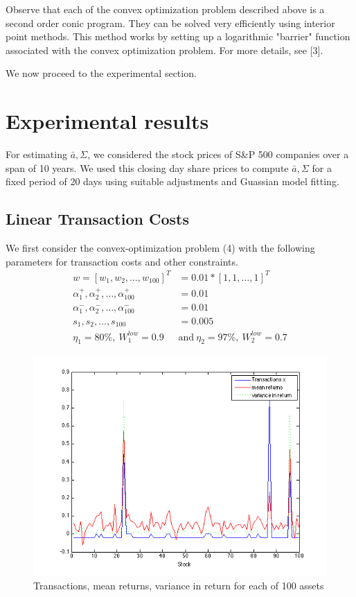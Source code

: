 \documentclass[a4paper]{article}
\begin{document}
Observe that each of the convex optimization problem described above is a second order conic program. They can be solved very efficiently using interior point methods. 
This method works by setting up a logarithmic "barrier" function associated with the convex optimization problem. For more details, see [3]. 


We now proceed to the experimental section.

\section{Experimental results}

For estimating $\bar{a},\Sigma$, we considered the stock prices of S\&P 500 companies over a span of 10 years. We used this closing day share prices to compute $\bar{a},\Sigma$ for a fixed period of 20 days using suitable adjustments and Guassian model fitting. 

\subsection{Linear Transaction Costs}
We first consider the convex-optimization problem (4) with the following parameters for transaction costs and other constraints.
\begin{align*}
w=[w_1,w_2,\ldots,w_{100}]^T&=0.01*[1,1,\ldots,1]^T\\
\alpha_1^+,\alpha_2^+,\ldots,\alpha_{100}^+ &=0.01\\
\alpha_1^-,\alpha_2^-,\ldots,\alpha_{100}^- &= 0.01\\
s_1,s_2,\ldots,s_{100} &=0.005\\
\eta_1 = 80 \%,\  W_1^{low}=0.9 \  &\text{and} \ \eta_2 = 97\%,\  W_2^{low} =0.7
\end{align*}

\begin{figure}
\centering
\includegraphics[width=5in]{stock_vis.png}
\caption{Transactions, mean returns, variance in return for each of 100 assets}
\label{fig:1}
\end{figure}
\end{document}
